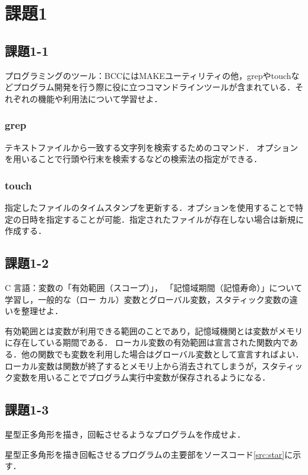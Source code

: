 \documentclass[twocolumn]{jsarticle}
\begin{document}
\section{課題1}
\subsection{課題1-1}
プログラミングのツール：BCCにはMAKEユーティリティの他，grepやtouchなどプログラム開発を行う際に役に立つコマンドラインツールが含まれている．それぞれの機能や利用法について学習せよ．

\subsubsection{grep}

テキストファイルから一致する文字列を検索するためのコマンド．
オプションを用いることで行頭や行末を検索するなどの検索法の指定ができる．

\subsubsection{touch}

指定したファイルのタイムスタンプを更新する．オプションを使用することで特定の日時を指定することが可能．指定されたファイルが存在しない場合は新規に作成する．


\subsection{課題1-2}
C 言語：変数の「有効範囲（スコープ）」， 「記憶域期間（記憶寿命）」について学習し，一般的な（ロー
カル）変数とグローバル変数，スタティック変数の違いを整理せよ．

有効範囲とは変数が利用できる範囲のことであり，記憶域機関とは変数がメモリに存在している期間である．
ローカル変数の有効範囲は宣言された関数内である．他の関数でも変数を利用した場合はグローバル変数として宣言すればよい．
ローカル変数は関数が終了するとメモリ上から消去されてしまうが，スタティック変数を用いることでプログラム実行中変数が保存されるようになる．


\subsection{課題1-3}
星型正多角形を描き，回転させるようなプログラムを作成せよ．

星型正多角形を描き回転させるプログラムの主要部をソースコード\ref{src:star}に示す．


\end{document}
